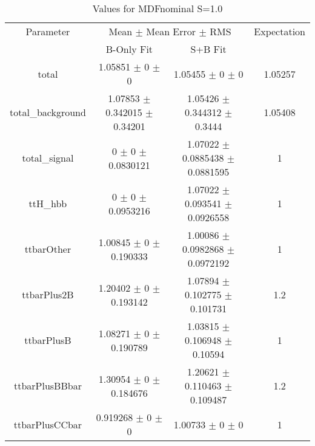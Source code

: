 \begin{table}
\centering
\caption{Values for MDFnominal S=1.0}
\begin{tabular}{cccc}
\toprule
Parameter & \multicolumn{2}{c}{Mean $\pm$ Mean Error $\pm$ RMS} & Expectation\\
 & B-Only Fit & S+B Fit & \\
\midrule
total & \num{1.05851} $\pm$ \num{0} $\pm$ \num{0} & \num{1.05455} $\pm$ \num{0} $\pm$ \num{0} & \num{1.05257}\\
total\_background & \num{1.07853} $\pm$ \num{0.342015} $\pm$ \num{0.34201} & \num{1.05426} $\pm$ \num{0.344312} $\pm$ \num{0.3444} & \num{1.05408}\\
total\_signal & \num{0} $\pm$ \num{0} $\pm$ \num{0.0830121} & \num{1.07022} $\pm$ \num{0.0885438} $\pm$ \num{0.0881595} & \num{1}\\
ttH\_hbb & \num{0} $\pm$ \num{0} $\pm$ \num{0.0953216} & \num{1.07022} $\pm$ \num{0.093541} $\pm$ \num{0.0926558} & \num{1}\\
ttbarOther & \num{1.00845} $\pm$ \num{0} $\pm$ \num{0.190333} & \num{1.00086} $\pm$ \num{0.0982868} $\pm$ \num{0.0972192} & \num{1}\\
ttbarPlus2B & \num{1.20402} $\pm$ \num{0} $\pm$ \num{0.193142} & \num{1.07894} $\pm$ \num{0.102775} $\pm$ \num{0.101731} & \num{1.2}\\
ttbarPlusB & \num{1.08271} $\pm$ \num{0} $\pm$ \num{0.190789} & \num{1.03815} $\pm$ \num{0.106948} $\pm$ \num{0.10594} & \num{1}\\
ttbarPlusBBbar & \num{1.30954} $\pm$ \num{0} $\pm$ \num{0.184676} & \num{1.20621} $\pm$ \num{0.110463} $\pm$ \num{0.109487} & \num{1.2}\\
ttbarPlusCCbar & \num{0.919268} $\pm$ \num{0} $\pm$ \num{0} & \num{1.00733} $\pm$ \num{0} $\pm$ \num{0} & \num{1}\\
\bottomrule
\end{tabular}
\end{table}